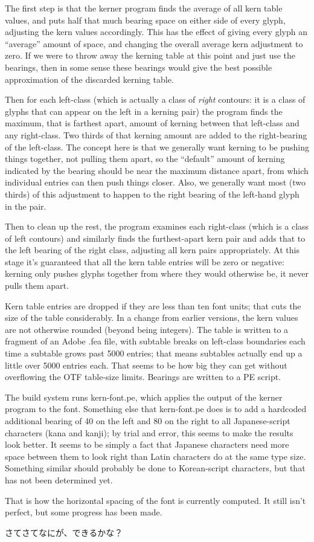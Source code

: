 \documentclass[14pt]{extarticle}
\begin{document}
The first step is that the kerner program finds the average of all kern
table values, and puts half that much bearing space on either side of every
glyph, adjusting the kern values accordingly.  This has the effect of giving
every glyph an ``average'' amount of space, and changing the overall average
kern adjustment to zero.  If we were to throw away the kerning table at this
point and just use the bearings, then in some sense these bearings would
give the best possible approximation of the discarded kerning table.

Then for each left-class (which is actually a class of \emph{right}
contours: it is a class of glyphs that can appear on the left in a kerning
pair) the program finds the maximum, that is farthest apart, amount of
kerning between that left-class and any right-class.  Two thirds of that
kerning amount are added to the right-bearing of the left-class.  The
concept here is that we generally want kerning to be pushing things
together, not pulling them apart, so the ``default'' amount of kerning
indicated by the bearing should be near the maximum distance apart, from
which individual entries can then push things closer.  Also, we generally
want most (two thirds) of this adjustment to happen to the right bearing of
the left-hand glyph in the pair.

Then to clean up the rest, the program examines each right-class (which is a
class of left contours) and similarly finds the furthest-apart kern pair and
adds that to the left bearing of the right class, adjusting all kern pairs
appropriately.  At this stage it's guaranteed that all the kern table
entries will be zero or negative:  kerning only pushes glyphs together from
where they would otherwise be, it never pulls them apart.

Kern table entries are dropped if they are less than ten font units; that
cuts the size of the table considerably.  In a change from earlier versions,
the kern values are not otherwise rounded (beyond being integers).  The
table is written to a fragment of an Adobe .fea file, with subtable breaks
on left-class boundaries each time a subtable grows past 5000 entries;
that means subtables actually end up a little over 5000 entries each.  That
seems to be how big they can get without overflowing the OTF table-size
limits.  Bearings are written to a PE script.

The build system runs kern-font.pe, which applies the output of the kerner
program to the font.  Something else that kern-font.pe does is to add a
hardcoded additional bearing of 40 on the left and 80 on the right to all
Japanese-script characters (kana and kanji); by trial and error, this seems
to make the results look better.  It seems to be simply a fact that Japanese
characters need more space between them to look right than Latin characters
do at the same type size.  Something similar should probably be done to
Korean-script characters, but that has not been determined yet.

That is how the horizontal spacing of the font is currently computed.  It
still isn't perfect, but some progress has been made.


\Large さてさてなにが、できるかな？
\end{document}
